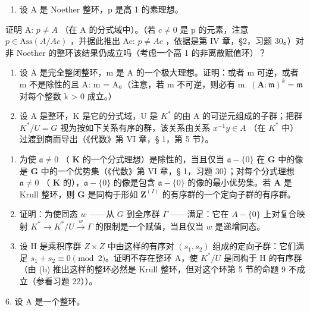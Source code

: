 \begin{enumerate}
\def\labelenumi{\arabic{enumi}.}
\setcounter{enumi}{2}
\tightlist
\item
  设 A 是 Noether 整环，p 是高 1 的素理想。
\end{enumerate}

  证明 A: \(p \neq A\) （在 A 的分式域中）。（若 \(c \neq 0\) 是 p 的元素，注意 \(p \in \text{Ass}(A/Ac)\) ，并据此推出 Ac: \(p \neq Ac\) ，依据是第 IV 章，§2，习题 30。）对非 Noether 的整环该结果仍成立吗（考虑一个高 1 的非离散赋值环）？

\begin{enumerate}
\def\labelenumi{\arabic{enumi}.}
\setcounter{enumi}{3}
\item
  设 A 是完全整闭整环，m 是 A 的一个极大理想。证明：或者 m 可逆，或者 m 不是除性的且 A: m = A。（注意，若 m 不可逆，则必有 m. \((\mathbf{A}:\mathfrak{m})^{k} = \mathfrak{m}\) 对每个整数 k \textgreater{} 0 成立。）
\item
  设 A 是整环，K 是它的分式域，U 是 \(K^{*}\) 的由 A 的可逆元组成的子群；把群 \(K^{*}/U = G\) 视为按如下关系有序的群，该关系由关系 \(x^{-1}y \in A\) （在 \(K^{*}\) 中）过渡到商而导出（《代数》第 VI 章，§ 1，第 5 节）。
\end{enumerate}

\begin{enumerate}
\def\labelenumi{(\alph{enumi})}
\item
  为使 \(\mathfrak{a} \neq 0\) （ \(\mathbf{K}\) 的一个分式理想）是除性的，当且仅当 \(\mathfrak{a} - \{0\}\) 在 \(\mathbf{G}\) 中的像是 \(\mathbf{G}\) 中的一个优势集（《代数》第 VI 章，§ 1，习题 30）；对每个分式理想 \(\mathfrak{a} \neq 0\) （ \(\mathbf{K}\) 的），\(\mathfrak{a} - \{0\}\) 的像是包含 \(\mathfrak{a} - \{0\}\) 的像的最小优势集。若 \(\mathbf{A}\) 是 Krull 整环，则 \(\mathbf{G}\) 是同构于形如 \(\mathbf{Z}^{(I)}\) 的有序群的一个定向子群的有序群。
\item
  证明：为使同态 \(w\) ——从 \(G\) 到全序群 \(\Gamma\) ——满足：它在 \(A - \{0\}\) 上对复合映射 \(K^* \to K^*/U \xrightarrow{w} \Gamma\) 的限制是一个赋值，当且仅当 \(w\) 是递增同态。
\item
  设 H 是乘积序群 \(Z \times Z\) 中由这样的有序对 \((s_{1}, s_{2})\) 组成的定向子群：它们满足 \(s_{1} + s_{2} \equiv 0 \pmod{2}\)。证明不存在整环 A，使 \(K^{*}/U\) 是同构于 H 的有序群（由 (b) 推出这样的整环必然是 Krull 整环，但对这个环第 5 节的命题 9 不成立（参看习题 22））。
\end{enumerate}

6. 设 A 是一个整环。\par

